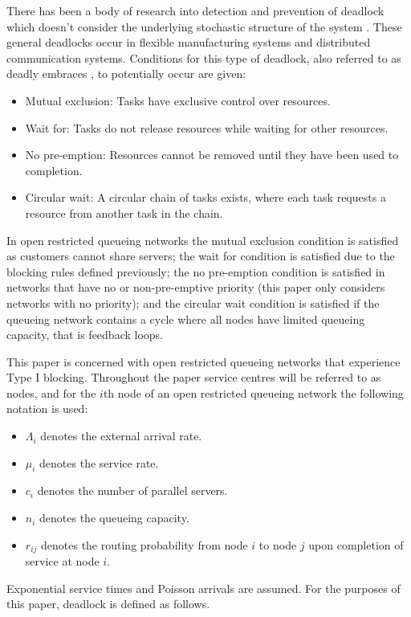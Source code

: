 \documentclass{article}
\numberwithin{equation}{section}
\begin{document}
There has been a body of research into detection and prevention of deadlock which doesn't consider the underlying stochastic structure of the system \cite{coffmanelphick71}.
These general deadlocks occur in flexible manufacturing systems and distributed communication systems.
Conditions for this type of deadlock, also referred to as deadly embraces \cite{coffmanelphick71}, to potentially occur are given:
\begin{itemize}
  \item Mutual exclusion: Tasks have exclusive control over resources.
  \item Wait for: Tasks do not release resources while waiting for other resources.
  \item No pre-emption: Resources cannot be removed until they have been used to completion.
  \item Circular wait: A circular chain of tasks exists, where each task requests a resource from another task in the chain.
\end{itemize}

In open restricted queueing networks the mutual exclusion condition is satisfied as customers cannot share servers; the wait for condition is satisfied due to the blocking rules defined previously; the no pre-emption condition is satisfied in networks that have no or non-pre-emptive priority (this paper only considers networks with no priority); and the circular wait condition is satisfied if the queueing network contains a cycle where all nodes have limited queueing capacity, that is feedback loops.

This paper is concerned with open restricted queueing networks that experience Type I blocking.
Throughout the paper service centres will be referred to as nodes, and for the $i$th node of an open restricted queueing network the following notation is used:

\begin{itemize}
  \item $\Lambda_i$ denotes the external arrival rate.
  \item $\mu_i$ denotes the service rate.
  \item $c_i$ denotes the number of parallel servers.
  \item $n_i$ denotes the queueing capacity.
  \item $r_{ij}$ denotes the routing probability from node $i$ to node $j$ upon completion of service at node $i$.
\end{itemize}

Exponential service times and Poisson arrivals are assumed.
For the purposes of this paper, deadlock is defined as follows.\\
\end{document}
